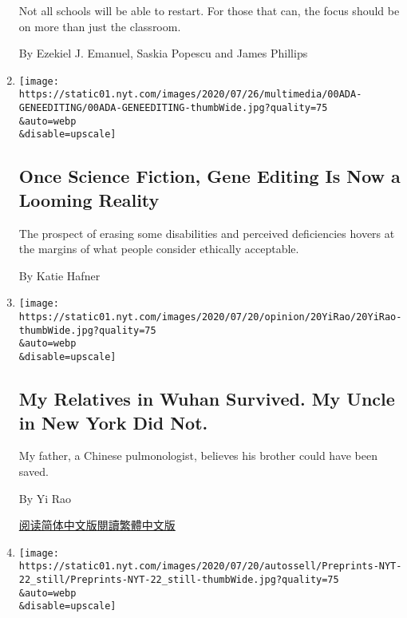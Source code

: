 \begin{enumerate}
  Not all schools will be able to restart. For those that can, the focus
  should be on more than just the classroom.

  By Ezekiel J. Emanuel, Saskia Popescu and James Phillips
\item
  \href{/2020/07/22/style/crispr-gene-editing-ethics.html}{}

  \texttt{[image: https://static01.nyt.com/images/2020/07/26/multimedia/00ADA-GENEEDITING/00ADA-GENEEDITING-thumbWide.jpg?quality=75\\\&auto=webp\\\&disable=upscale]}

  \hypertarget{once-science-fiction-gene-editing-is-now-a-looming-reality}{%
  \subsection{Once Science Fiction, Gene Editing Is Now a Looming
  Reality}\label{once-science-fiction-gene-editing-is-now-a-looming-reality}}

  The prospect of erasing some disabilities and perceived deficiencies
  hovers at the margins of what people consider ethically acceptable.

  By Katie Hafner
\item
  \href{/2020/07/22/opinion/coronavirus-china-us.html}{}

  \texttt{[image: https://static01.nyt.com/images/2020/07/20/opinion/20YiRao/20YiRao-thumbWide.jpg?quality=75\\\&auto=webp\\\&disable=upscale]}

  \hypertarget{my-relatives-in-wuhan-survived-my-uncle-in-new-york-did-not}{%
  \subsection{My Relatives in Wuhan Survived. My Uncle in New York Did
  Not.}\label{my-relatives-in-wuhan-survived-my-uncle-in-new-york-did-not}}

  My father, a Chinese pulmonologist, believes his brother could have
  been saved.

  By Yi Rao

  \href{https://cn.nytimes.com/opinion/20200723/coronavirus-china-us/}{阅读简体中文版}\href{https://cn.nytimes.com/opinion/20200723/coronavirus-china-us/zh-hant/}{閱讀繁體中文版}
\item
  \href{/2020/07/20/opinion/coronavirus-preprints.html}{}

  \texttt{[image: https://static01.nyt.com/images/2020/07/20/autossell/Preprints-NYT-22\_still/Preprints-NYT-22\_still-thumbWide.jpg?quality=75\\\&auto=webp\\\&disable=upscale]}


\end{enumerate}
